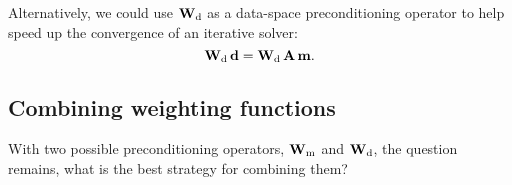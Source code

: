 \par
Alternatively, we could use ${\bf W}_{\rm d}$ as a data-space
preconditioning operator to help speed up 
the convergence of an iterative solver:
\begin{equation} \label{fig:underdetprec}
{\bf W}_{\rm d} \, {\bf d}={\bf W}_{\rm d} \, {\bf A}\, {\bf m}. 
\end{equation}

\subsection{Combining weighting functions}
With two possible preconditioning operators, ${\bf W}_{\rm m}$ and
${\bf W}_{\rm d}$, the question remains, what is the best strategy for
combining them?


